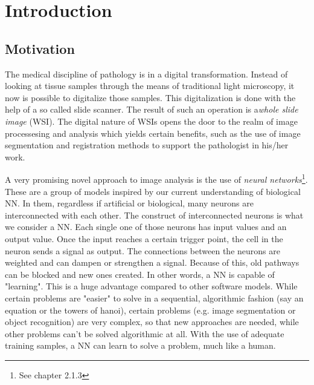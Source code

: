 \chapter{Introduction}

\section{Motivation}
The medical discipline of pathology is in a digital transformation. Instead of looking at tissue samples through the means of traditional light microscopy, it now is possible to digitalize those samples. This digitalization is done with the help of a so called slide scanner. The result of such an operation is a\emph{whole slide image} (WSI)\cite{Cornish13}. The digital nature of WSIs opens the door to the realm of image processesing and analysis which yields certain benefits, such as the use of image segmentation and registration methods to support the pathologist in his/her work.

A very promising novel approach to image analysis is the use of \emph{neural networks}\footnote{See chapter 2.1.3}. These are a group of models inspired by our current understanding of biological NN. In them, regardless if artificial or biological, many neurons are interconnected with each other. The construct of interconnected neurons is what we consider a NN. Each single one of those neurons has input values and an output value. Once the input reaches a certain trigger point, the cell in the neuron sends a signal as output. The connections between the neurons are weighted and can dampen or strengthen a signal. Because of this, old pathways can be blocked and new ones created. In other words, a NN is capable of "learning"\cite{Kriesel07}. This is a huge advantage compared to other software models. While certain problems are "easier" to solve in a sequential, algorithmic fashion (say an equation or the towers of hanoi), certain problems (e.g. image segmentation or object recognition) are very complex, so that new approaches are needed, while other problems can't be solved algorithmic at all. With the use of adequate training samples, a NN can learn to solve a problem, much like a human.

